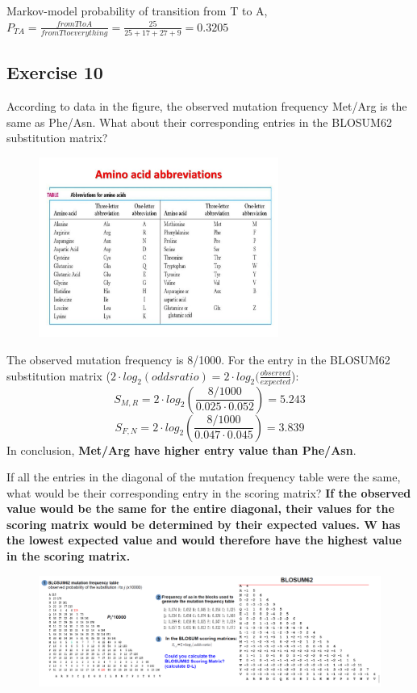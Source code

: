 Markov-model probability of transition from T to A, $P_{TA} = \frac{from T to A}{from T to everything} = \frac{25}{25 + 17 + 27 + 9} = 0.3205$

\subsection{Exercise 10}
According to data in the figure, the observed mutation frequency Met/Arg is the same as Phe/Asn. What about their corresponding entries in the BLOSUM62 substitution matrix?

\begin{figure}[htbp]
\centering
\includegraphics[width = 0.7\textwidth]{figs/aa_abbreviations.png}
\end{figure}

The observed mutation frequency is 8/1000. For the entry in the BLOSUM62 substitution matrix ($2 \cdot log_2 (odds ratio) = 2 \cdot log_2 (\frac{observed}{expected}$):
$$S_{M, R} = 2 \cdot log_2 (\frac{8/1000}{0.025 \cdot 0.052}) = 5.243$$
$$S_{F, N} = 2 \cdot log_2 (\frac{8/1000}{0.047 \cdot 0.045}) = 3.839$$
In conclusion, \textbf{Met/Arg have higher entry value than Phe/Asn}.

If all the entries in the diagonal of the mutation frequency table were the same, what would be their corresponding entry in the scoring matrix? \textbf{If the observed value would be the same for the entire diagonal, their values for the scoring matrix would be determined by their expected values. W has the lowest expected value and would therefore have the highest value in the scoring matrix.}

\begin{figure}[htbp]
\centering
\includegraphics[width = \textwidth]{figs/ejercicio-blosum.png}
\end{figure}

